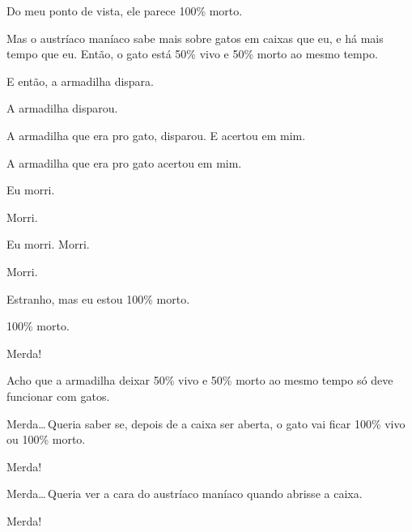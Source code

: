 Do meu ponto de vista, ele parece 100\% morto.

Mas o austríaco maníaco sabe mais sobre gatos em caixas que eu, e há mais tempo que eu. Então, o gato está 50\% vivo e 50\% morto ao mesmo tempo.

E então, a armadilha dispara.

A armadilha disparou.

A armadilha que era pro gato, disparou. E acertou em mim.

A armadilha que era pro gato acertou em mim.

Eu morri.

Morri.

Eu morri. Morri.

Morri.

Estranho, mas eu estou 100\% morto.

100\% morto.

Merda!

Acho que a armadilha deixar 50\% vivo e 50\% morto ao mesmo tempo só deve funcionar com gatos.

Merda\ldots\,Queria saber se, depois de a caixa ser aberta, o gato vai ficar 100\% vivo ou 100\% morto.

Merda!

Merda\ldots\,Queria ver a cara do austríaco maníaco quando abrisse a caixa.

Merda!
